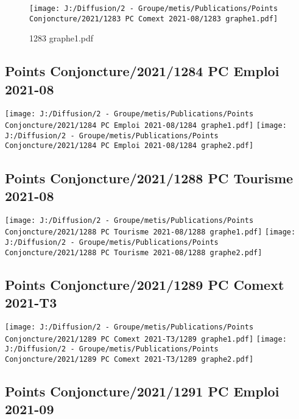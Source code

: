 \documentclass[
]{article}
\begin{document}
\begin{figure}
\centering
\texttt{[image: J:/Diffusion/2 - Groupe/metis/Publications/Points Conjoncture/2021/1283 PC Comext 2021-08/1283 graphe1.pdf]}
\caption{1283 graphe1.pdf}
\end{figure}

\hypertarget{points-conjoncture20211284-pc-emploi-2021-08}{%
\subsection{Points Conjoncture/2021/1284 PC Emploi
2021-08}\label{points-conjoncture20211284-pc-emploi-2021-08}}

\texttt{[image: J:/Diffusion/2 - Groupe/metis/Publications/Points Conjoncture/2021/1284 PC Emploi 2021-08/1284 graphe1.pdf]}
\texttt{[image: J:/Diffusion/2 - Groupe/metis/Publications/Points Conjoncture/2021/1284 PC Emploi 2021-08/1284 graphe2.pdf]}

\hypertarget{points-conjoncture20211288-pc-tourisme-2021-08}{%
\subsection{Points Conjoncture/2021/1288 PC Tourisme
2021-08}\label{points-conjoncture20211288-pc-tourisme-2021-08}}

\texttt{[image: J:/Diffusion/2 - Groupe/metis/Publications/Points Conjoncture/2021/1288 PC Tourisme 2021-08/1288 graphe1.pdf]}
\texttt{[image: J:/Diffusion/2 - Groupe/metis/Publications/Points Conjoncture/2021/1288 PC Tourisme 2021-08/1288 graphe2.pdf]}

\hypertarget{points-conjoncture20211289-pc-comext-2021-t3}{%
\subsection{Points Conjoncture/2021/1289 PC Comext
2021-T3}\label{points-conjoncture20211289-pc-comext-2021-t3}}

\texttt{[image: J:/Diffusion/2 - Groupe/metis/Publications/Points Conjoncture/2021/1289 PC Comext 2021-T3/1289 graphe1.pdf]}
\texttt{[image: J:/Diffusion/2 - Groupe/metis/Publications/Points Conjoncture/2021/1289 PC Comext 2021-T3/1289 graphe2.pdf]}

\hypertarget{points-conjoncture20211291-pc-emploi-2021-09}{%
\subsection{Points Conjoncture/2021/1291 PC Emploi
2021-09}\label{points-conjoncture20211291-pc-emploi-2021-09}}
\end{document}
